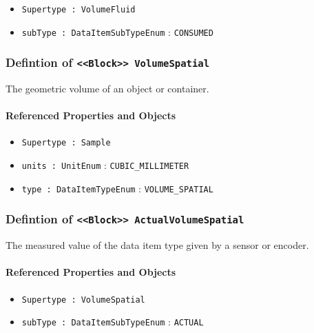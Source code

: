 \begin{itemize}
\item \texttt{Supertype : VolumeFluid}

\item \texttt{subType : DataItemSubTypeEnum} : \texttt{CONSUMED}

\end{itemize}
\FloatBarrier
\subsubsection{Defintion of \texttt{<<Block>> VolumeSpatial}}
  \label{type:VolumeSpatial}

\FloatBarrier

The geometric volume of an object or container.

\FloatBarrier
\paragraph{Referenced Properties and Objects}

\begin{itemize}
\item \texttt{Supertype : Sample}

\item \texttt{units : UnitEnum} : \texttt{CUBIC_MILLIMETER}

\item \texttt{type : DataItemTypeEnum} : \texttt{VOLUME_SPATIAL}

\end{itemize}
\FloatBarrier
\subsubsection{Defintion of \texttt{<<Block>> ActualVolumeSpatial}}
  \label{type:ActualVolumeSpatial}

\FloatBarrier

The measured value of the data item type given by a sensor or encoder.

\FloatBarrier
\paragraph{Referenced Properties and Objects}

\begin{itemize}
\item \texttt{Supertype : VolumeSpatial}

\item \texttt{subType : DataItemSubTypeEnum} : \texttt{ACTUAL}

\end{itemize}
\FloatBarrier
